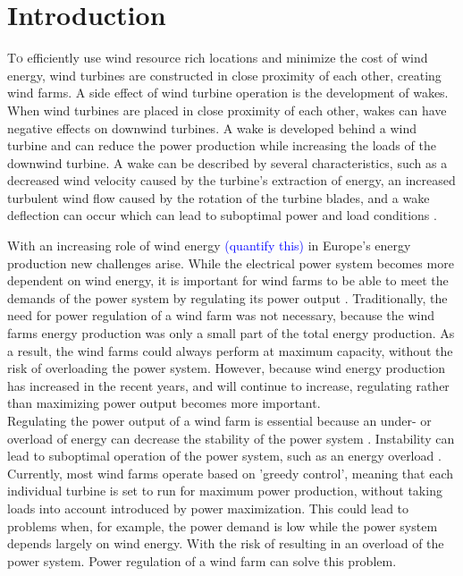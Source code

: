 \section{Introduction}
\lettrine[nindent=0em,lines=3]
To efficiently use wind resource rich locations and minimize the cost of wind energy, wind turbines are constructed in close proximity of each other, creating wind farms. A side effect of wind turbine operation is the development of wakes. When wind turbines are placed in close proximity of each other, wakes can have negative effects on downwind turbines. A wake is developed behind a wind turbine and can reduce the power production while increasing the loads of the downwind turbine. A wake can be described by several characteristics, such as a decreased wind velocity caused by the turbine's extraction of energy, an increased turbulent wind flow caused by the rotation of the turbine blades, and a wake deflection can occur which can lead to suboptimal power and load conditions \cite{Boersma2017, Wilson2017, Dijk2016, Fleming2014, Zalkind2016}.

With an increasing role of wind energy \textcolor{blue}{(quantify this)} in Europe's energy production new challenges arise\cite{Nat2016}. While the electrical power system becomes more dependent on wind energy, it is important for wind farms to be able to meet the demands of the power system by regulating its power output \cite{Tande2003}. Traditionally, the need for power regulation of a wind farm was not necessary, because the wind farms energy production was only a small part of the total energy production. As a result, the wind farms could always perform at maximum capacity, without the risk of overloading the power system. However, because wind energy production has increased in the recent years, and will continue to increase, regulating rather than maximizing power output becomes more important.\\ 
\indent Regulating the power output of a wind farm is essential because an under- or overload of energy can decrease the stability of the power system \cite{Tande2003}. Instability can lead to suboptimal operation of the power system, such as an energy overload \cite{Tande2003, Hansen20}. Currently, most wind farms operate based on 'greedy control', meaning that each individual turbine is set to run for maximum power production, without taking loads into account introduced by power maximization. This could lead to problems when, for example, the power demand is low while the power system depends largely on wind energy. With the risk of resulting in an overload of the power system. Power regulation of a wind farm can solve this problem.

